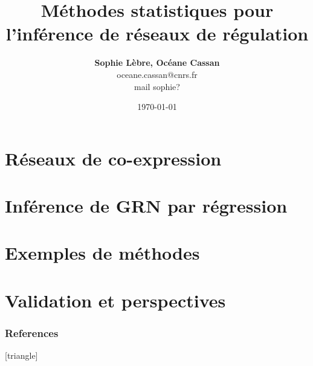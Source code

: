 \documentclass[xcolor=dvipsnames]{beamer}
\title[L'inférence statistique de GRN]{Méthodes statistiques pour l'inférence de réseaux de régulation}
\date{\today}
\author[Sophie Lèbre, Océane Cassan]
{\textbf{Sophie Lèbre, Océane Cassan} \\ oceane.cassan@cnrs.fr \\ mail sophie?}
\institute[]{
BFP M1, Parcours Bipa}
\begin{document}
	
	\begin{frame}
		\titlepage
	\end{frame}
	
	\begin{frame}
		\tableofcontents
	\end{frame}
	
	

    
    
\section{Réseaux de co-expression}


    	

    	
\section{Inférence de GRN par régression}


    
	
	
	\section{Exemples de méthodes}

	
	
	\section{Validation et perspectives}
	
	
	


\begin{frame}[allowframebreaks]
    \frametitle{References}
    [triangle]
    \scriptsize
    
    
\end{frame}
\end{document}
